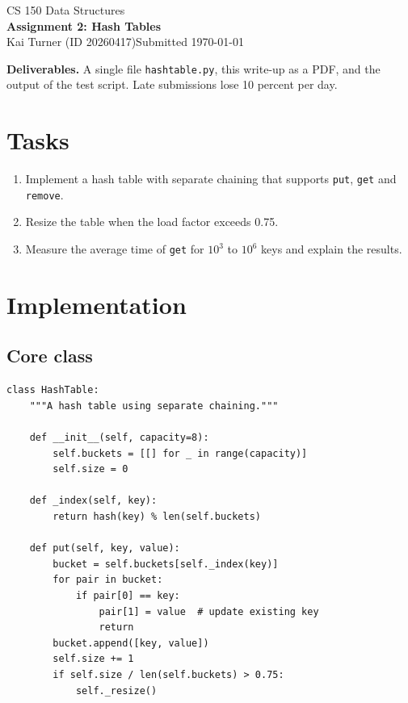 \documentclass[11pt]{article}
\newcommand{\course}{CS 150 Data Structures}
\newcommand{\assignment}{Assignment 2: Hash Tables}
\newcommand{\student}{Kai Turner (ID 20260417)}
\begin{document}
\begin{center}
  {\sffamily\small\color{gray}\course}\\[4pt]
  {\sffamily\LARGE\bfseries\color{head}\assignment}\\[6pt]
  \student \quad\textbar\quad Submitted \today
\end{center}

\begin{tcolorbox}[enhanced,colback=codebg,colframe=codebg,borderline west={3pt}{0pt}{codestr},arc=0pt]
  \textbf{Deliverables.} A single file \texttt{hashtable.py}, this write-up as a PDF, and the output of the test script. Late submissions lose 10 percent per day.
\end{tcolorbox}

\section{Tasks}
\begin{enumerate}[label=\textbf{Task \arabic*.},leftmargin=*,align=left]
  \item Implement a hash table with separate chaining that supports \texttt{put}, \texttt{get} and \texttt{remove}.
  \item Resize the table when the load factor exceeds 0.75.
  \item Measure the average time of \texttt{get} for $10^3$ to $10^6$ keys and explain the results.
\end{enumerate}

\section{Implementation}
\subsection{Core class}
\begin{lstlisting}
class HashTable:
    """A hash table using separate chaining."""

    def __init__(self, capacity=8):
        self.buckets = [[] for _ in range(capacity)]
        self.size = 0

    def _index(self, key):
        return hash(key) % len(self.buckets)

    def put(self, key, value):
        bucket = self.buckets[self._index(key)]
        for pair in bucket:
            if pair[0] == key:
                pair[1] = value  # update existing key
                return
        bucket.append([key, value])
        self.size += 1
        if self.size / len(self.buckets) > 0.75:
            self._resize()
\end{lstlisting}
\end{document}
